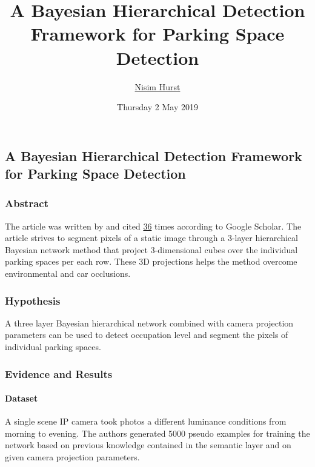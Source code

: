 \documentclass[]{article}
\title{A Bayesian Hierarchical Detection Framework for Parking Space Detection}
\author{\href{mailto:langheran@gmail.com}{Nisim Hurst}}
\date{Thursday 2 May 2019}
\let\oldparagraph\paragraph
\renewcommand{\paragraph}[1]{\oldparagraph{#1}\mbox{}}
\begin{document}
\maketitle

\label{toc}

\hypertarget{a-bayesian-hierarchical-detection-framework-for-parking-space-detection}{%
\subsection{A Bayesian Hierarchical Detection Framework for Parking Space Detection}\label{a-bayesian-hierarchical-detection-framework-for-parking-space-detection}}

\hypertarget{abstract}{%
\subsubsection{Abstract}\label{abstract}}

The article was written by \autocite{Ching_Chun_Huang_2008} and cited \href{https://scholar.google.com/scholar?cluster=17702009018238844864\&hl=en\&as_sdt=2005\&sciodt=0,5}{36} times according to Google Scholar. The article strives to segment pixels of a static image through a 3-layer hierarchical Bayesian network method that project 3-dimensional cubes over the individual parking spaces per each row. These 3D projections helps the method overcome environmental and car occlusions.

\hypertarget{hypothesis}{%
\subsubsection{Hypothesis}\label{hypothesis}}

A three layer Bayesian hierarchical network combined with camera projection parameters can be used to detect occupation level and segment the pixels of individual parking spaces.

\hypertarget{evidence-and-results}{%
\subsubsection{Evidence and Results}\label{evidence-and-results}}

\hypertarget{dataset}{%
\paragraph{Dataset}\label{dataset}}

A single scene IP camera took photos a different luminance conditions from morning to evening. The authors generated 5000 pseudo examples for training the network based on previous knowledge contained in the semantic layer and on given camera projection parameters.
\end{document}
